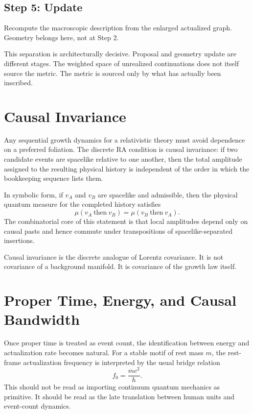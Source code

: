\documentclass[11pt]{article}
\begin{document}
\subsection*{Step 5: Update}
Recompute the macroscopic description from the enlarged actualized graph. Geometry belongs here, not at Step 2.

This separation is architecturally decisive. Proposal and geometry update are different stages. The weighted space of unrealized continuations does not itself source the metric. The metric is sourced only by what has actually been inscribed.

\section{Causal Invariance}
Any sequential growth dynamics for a relativistic theory must avoid dependence on a preferred foliation. The discrete RA condition is causal invariance: if two candidate events are spacelike relative to one another, then the total amplitude assigned to the resulting physical history is independent of the order in which the bookkeeping sequence lists them.

In symbolic form, if $v_A$ and $v_B$ are spacelike and admissible, then the physical quantum measure for the completed history satisfies
\begin{equation}
\mu(v_A\ \text{then}\ v_B)=\mu(v_B\ \text{then}\ v_A).
\end{equation}
The combinatorial core of this statement is that local amplitudes depend only on causal pasts and hence commute under transpositions of spacelike-separated insertions.

Causal invariance is the discrete analogue of Lorentz covariance. It is not covariance of a background manifold. It is covariance of the growth law itself.

\section{Proper Time, Energy, and Causal Bandwidth}
Once proper time is treated as event count, the identification between energy and actualization rate becomes natural. For a stable motif of rest mass $m$, the rest-frame actualization frequency is interpreted by the usual bridge relation
\begin{equation}
f_0=\frac{mc^2}{h}.
\end{equation}
This should not be read as importing continuum quantum mechanics as primitive. It should be read as the late translation between human units and event-count dynamics.
\end{document}
